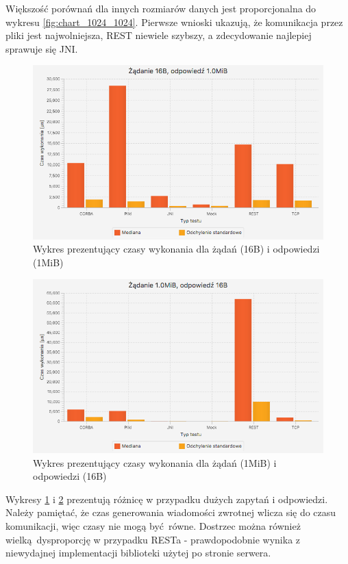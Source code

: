 Większość porównań dla innych rozmiarów danych jest proporcjonalna do wykresu \ref{fig:chart_1024_1024}. Pierwsze wnioski ukazują, że komunikacja przez pliki jest najwolniejsza, REST niewiele szybszy, a zdecydowanie najlepiej sprawuje się JNI.


\begin{figure}[H]
    \centering
    \includegraphics[scale=0.38]{img/charts/chart_16_1048576.png}
    \caption{Wykres prezentujący czasy wykonania dla żądań (16B) i odpowiedzi (1MiB)}
    \label{fig:chart_16_1048576}
\end{figure}

\begin{figure}[H]
    \centering
    \includegraphics[scale=0.38]{img/charts/chart_1048576_16.png}
    \caption{Wykres prezentujący czasy wykonania dla żądań (1MiB) i odpowiedzi (16B)}
    \label{fig:chart_1048576_16}
\end{figure}

Wykresy \ref{fig:chart_16_1048576} i \ref{fig:chart_1048576_16} prezentują różnicę w przypadku dużych zapytań i odpowiedzi. Należy pamiętać, że czas generowania wiadomości zwrotnej wlicza się do czasu komunikacji, więc czasy nie mogą być równe.
Dostrzec można również wielką dysproporcję w przypadku RESTa - prawdopodobnie wynika z niewydajnej implementacji biblioteki użytej po stronie serwera. 


